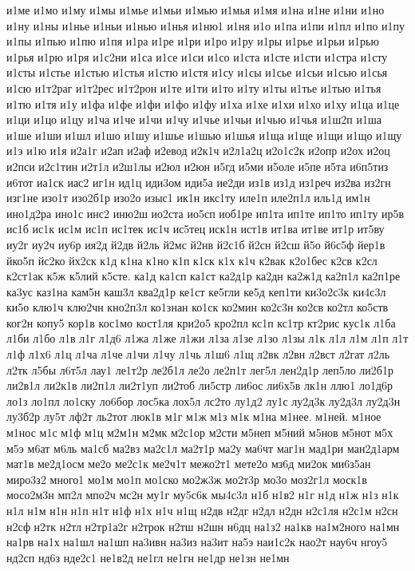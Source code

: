 {и1ме
и1мо
и1му
и1мы
и1мье
и1мьи
и1мью
и1мья
и1мя
и1на
и1не
и1ни
и1но
и1ну
и1ны
и1нье
и1ньи
и1нью
и1нья
и1ню1
и1ня
и1о
и1па
и1пи
и1пл
и1по
и1пу
и1пы
и1пью
и1пю
и1пя
и1ра
и1ре
и1ри
и1ро
и1ру
и1ры
и1рье
и1рьи
и1рью
и1рья
и1рю
и1ря
и1с2ни
и1са
и1се
и1си
и1со
и1ста
и1сте
и1сти
и1стра
и1сту
и1сты
и1стье
и1стью
и1стья
и1стю
и1стя
и1су
и1сы
и1сье
и1сьи
и1сью
и1сья
и1сю
и1т2раг
и1т2рес
и1т2рон
и1те
и1ти
и1то
и1ту
и1ты
и1тье
и1тью
и1тья
и1тю
и1тя
и1у
и1фа
и1фе
и1фи
и1фо
и1фу
и1ха
и1хе
и1хи
и1хо
и1ху
и1ца
и1це
и1ци
и1цо
и1цу
и1ча
и1че
и1чи
и1чу
и1чье
и1чьи
и1чью
и1чья
и1ш2п
и1ша
и1ше
и1ши
и1шл
и1шо
и1шу
и1шье
и1шью
и1шья
и1ща
и1ще
и1щи
и1що
и1щу
и1э
и1ю
и1я
и2а1г
и2ап
и2аф
и2евод
и2к1ч
и2л1а2ц
и2о1с2к
и2опр
и2ох
и2оц
и2пси
и2с1тин
и2т1л
и2ш1лы
и2юл
и2юн
и5гд
и5ми
и5оле
и5пе
и5та
и6п5тиз
и6тот
иа1ск
иас2
иг1н
ид1ц
иди3ом
иди5а
ие2ди
из1в
из1д
из1реч
из2ва
из2гн
изг1не
изо1т
изо2б1р
изо2о
изыс1
ик1н
икс1ту
иле1п
иле2п1л
иль1д
им1н
ино1д2ра
ино1с
инс2
иню2ш
ио2ста
ио5сп
иоб1ре
ип1та
ип1те
ип1то
ип1ту
ир5в
ис1б
ис1к
ис1м
ис1п
ис1тек
ис1ч
ис5тец
иск1н
ист1в
ит1ва
ит1ве
ит1р
ит5ву
иу2г
иу2ч
иу6р
ия2д
й2дв
й2ль
й2мс
й2нв
й2с1б
й2сн
й2сш
й5о
й6с5ф
йер1в
йко5п
йс2ко
йх2ск
к1д
к1на
к1но
к1п
к1ск
к1х
к1ч
к2вак
к2о1бес
к2св
к2сл
к2ст1ак
к5ж
к5лий
к5сте.
ка1д
ка1сп
ка1ст
ка2д1р
ка2дн
ка2ж1д
ка2п1л
ка2п1ре
ка3ус
каз1на
кам5н
каш3л
ква2д1р
ке1ст
ке5гли
ке5д
кеп1ти
ки3о2с3к
ки4с3л
ки5о
клю1ч
клю2чн
кно2п3л
ко1знан
ко1ск
ко2мин
ко2с3н
ко2св
ко2тл
ко5ств
ког2н
копу5
кор1в
кос1мо
кост1ля
кри2о5
кро2пл
кс1п
кс1тр
кт2рис
кус1к
л1ба
л1би
л1бо
л1в
л1г
л1д6
л1жа
л1же
л1жи
л1за
л1зе
л1зо
л1зы
л1к
л1л
л1м
л1п
л1т
л1ф
л1х6
л1ц
л1ча
л1че
л1чи
л1чу
л1чь
л1ш6
л1щ
л2вк
л2вн
л2вст
л2гат
л2ль
л2тк
л5бы
л6т5л
лау1
ле1т2р
ле2б1л
ле2о
ле2п1т
лег5л
лен2д1р
леп5ло
ли2б1р
ли2в1л
ли2к1в
ли2п1л
ли2т1уп
ли2тоб
ли5стр
ли6ос
ли6х5в
лк1н
ллю1
ло1д6р
ло1з
ло1пл
ло1ску
ло6бор
лос5ка
лох5л
лс2то
лу1д2
лу1с
лу2д3к
лу2д3л
лу2д3н
лу3б2р
лу5т
лф2т
ль2тот
люк1в
м1г
м1ж
м1з
м1к
м1на
м1нее.
м1ней.
м1ное
м1нос
м1с
м1ф
м1ц
м2м1н
м2мк
м2с1ор
м2сти
м5неп
м5ний
м5нов
м5нот
м5х
м5э
м6ат
м6ль
ма1сб
ма2вз
ма2с1л
ма2т1р
ма2у
ма6чт
маг1н
мад1ри
ман2д1арм
мат1в
ме2д1осм
ме2о
ме2с1к
ме2ч1т
межо2т1
мете2о
мз6д
ми2ок
ми6з5ан
миро3з2
много1
мо1м
мо1п
мо1ско
мо2ж3ж
мо2т3р
мо3о
моз2г1л
моск1в
мосо2м3н
мп2л
мпо2ч
мс2н
му1г
му5с6к
мы4с3л
н1б
н1в2
н1г
н1д
н1ж
н1з
н1к
н1л
н1м
н1н
н1п
н1т
н1ф
н1х
н1ч
н1щ
н2дв
н2дг
н2дл
н2дн
н2с1ля
н2с1м
н2сн
н2сф
н2тк
н2тл
н2тр1а2г
н2трок
н2тш
н2шн
н6дц
на1з2
на1кв
на1м2ного
на1мн
на1рв
на1х
на1шл
на1шп
на3ивн
на3из
на3ит
на5э
наи1с2к
нао2т
нау6ч
нгоу5
нд2сп
нд6з
нде2с1
не1в2д
не1гл
не1гн
не1др
не1зн
не1мн
}
